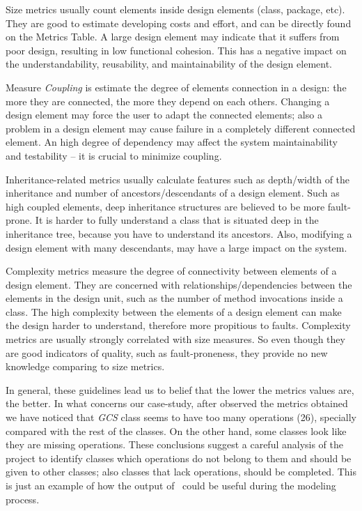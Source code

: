 Size metrics usually count elements inside design elements (class, package, etc).
They are good to estimate developing costs and effort, and can be directly found on the Metrics Table.
A large design element may indicate that it suffers from poor design, resulting in low functional cohesion. This has a negative impact on the understandability, reusability, and maintainability of the design element.

Measure \emph{Coupling} is estimate the degree of elements connection in a design: the more they are connected, the more they depend on each others. 
Changing a design element may force the user to adapt the connected elements; also a problem in a design element may cause failure in a completely different connected element. 
An high degree of dependency may affect the system maintainability and testability -- it is crucial to minimize coupling.

Inheritance-related metrics usually calculate features such as depth/width of the inheritance and number of ancestors/descendants of a design element. Such as high coupled elements, deep inheritance structures are believed to be more fault-prone. It is harder to fully understand a class that is situated deep in the inheritance tree, because you have to understand its ancestors. Also, modifying a design element with many descendants, may have a large impact on the system.

Complexity metrics measure the degree of connectivity between elements of a design element. They are concerned with relationships/dependencies between the elements in the design unit, such as the number of method invocations inside a class. The high complexity between the elements of a design element can make the design harder to understand, therefore more propitious to faults. Complexity metrics are usually strongly correlated with size measures. So even though they are good indicators of quality, such as fault-proneness, they provide no new knowledge comparing to size metrics.

In general, these guidelines lead us to belief that the lower the metrics values are, the better.
In what concerns our case-study, after observed the metrics obtained we have noticed that \emph{GCS} class seems to have too many operations (26), specially compared with the rest of the classes.
On the other hand, some classes look like they are missing operations.
These conclusions suggest a careful analysis of the project to identify classes which operations do not belong to them and should be given to other classes; also classes that lack operations, should be completed.
This is just an example of how the output of \sdmetrics\ could be useful during the modeling process.

